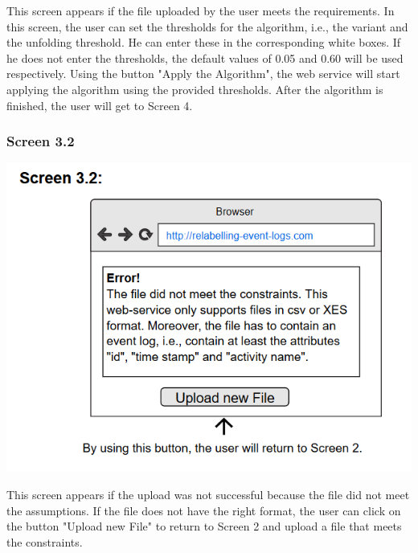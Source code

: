 \documentclass[notitlepage]{article}
\begin{document}
\begin{flushleft}
This screen appears if the file uploaded by the user meets the requirements. In this screen, the user can set the thresholds for the algorithm, i.e., the variant and the unfolding threshold. He can enter these in the corresponding white boxes. If he does not enter the thresholds, the default values of 0.05 and 0.60 will be used respectively. Using the button "Apply the Algorithm", the web service will start applying the algorithm using the provided thresholds. After the algorithm is finished, the user will get to Screen 4.

\subsubsection{Screen 3.2}
\includegraphics[scale=0.9]{InterfaceMockup3-2.png}

This screen appears if the upload was not successful because the file did not meet the assumptions. If the file does not have the right format, the user can click on the button "Upload new File" to return to Screen 2 and upload a file that meets the constraints.



\end{flushleft}
\end{document}
